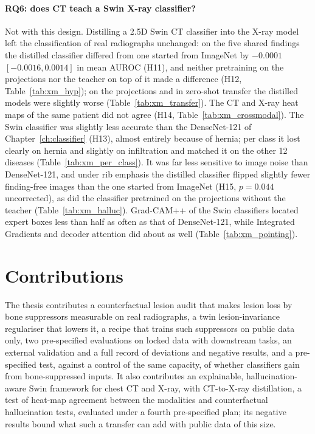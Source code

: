 \paragraph{RQ6: does CT teach a Swin X-ray classifier?} Not with this design. Distilling a 2.5D Swin CT classifier into the X-ray model
left the classification of real radiographs unchanged: on the five shared findings the distilled classifier differed from one started from
ImageNet by $-0.0001$ $[-0.0016, 0.0014]$ in mean AUROC (H11), and neither pretraining on the projections nor the teacher on top of it made
a difference (H12, Table~\ref{tab:xm_hyp}); on the projections and in zero-shot transfer the distilled models were slightly worse
(Table~\ref{tab:xm_transfer}). The CT and X-ray heat maps of the same patient did not agree (H14, Table~\ref{tab:xm_crossmodal}). The Swin
classifier was slightly less accurate than the DenseNet-121 of Chapter~\ref{ch:classifier} (H13), almost entirely because of hernia; per
class it lost clearly on hernia and slightly on infiltration and matched it on the other 12 diseases (Table~\ref{tab:xm_per_class}). It was far less sensitive to image noise than DenseNet-121, and under rib emphasis the distilled classifier
flipped slightly fewer finding-free images than the one started from ImageNet (H15, $p=0.044$ uncorrected), as did the classifier pretrained
on the projections without the teacher (Table~\ref{tab:xm_halluc}). Grad-CAM++ of the Swin classifiers located expert boxes less than half
as often as that of DenseNet-121, while Integrated Gradients and decoder attention did about as well (Table~\ref{tab:xm_pointing}).

\section{Contributions}
The thesis contributes a counterfactual lesion audit that makes lesion loss by bone suppressors measurable on real radiographs, a twin
lesion-invariance regulariser that lowers it, a recipe that trains such suppressors on public data only, two pre-specified evaluations
on locked data with downstream tasks, an external validation and a full record of deviations and negative results, and a pre-specified test,
against a control of the same capacity, of whether classifiers gain from bone-suppressed inputs. It also contributes an explainable,
hallucination-aware Swin framework for chest CT and X-ray, with CT-to-X-ray distillation, a test of heat-map agreement between the
modalities and counterfactual hallucination tests, evaluated under a fourth pre-specified plan; its negative results bound what such a
transfer can add with public data of this size.

